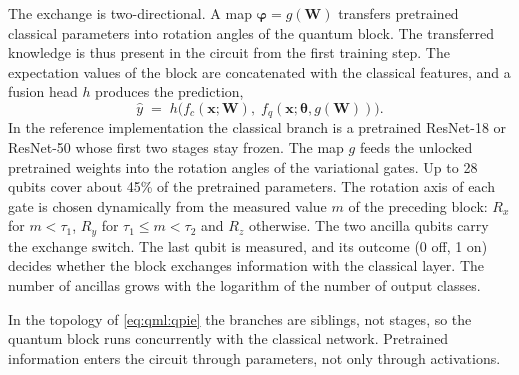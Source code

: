 The exchange is two-directional. A map $\bm{\varphi} = g(\bm{W})$ transfers pretrained classical parameters into rotation angles of the quantum block. The transferred knowledge is thus present in the circuit from the first training step. The expectation values of the block are concatenated with the classical features, and a fusion head $h$ produces the prediction,
\begin{equation}\label{eq:qml:qpie}
\hat{y} \;=\; h\big(f_c(\bm{x}; \bm{W}),\; f_q(\bm{x}; \bm{\theta}, g(\bm{W}))\big).
\end{equation}
In the reference implementation \cite{guo2025qpie} the classical branch is a pretrained ResNet-18 or ResNet-50 whose first two stages stay frozen. The map $g$ feeds the unlocked pretrained weights into the rotation angles of the variational gates. Up to 28 qubits cover about 45\% of the pretrained parameters. The rotation axis of each gate is chosen dynamically from the measured value $m$ of the preceding block: $R_x$ for $m<\tau_1$, $R_y$ for $\tau_1\le m<\tau_2$ and $R_z$ otherwise. The two ancilla qubits carry the exchange switch. The last qubit is measured, and its outcome (0 off, 1 on) decides whether the block exchanges information with the classical layer. The number of ancillas grows with the logarithm of the number of output classes.

In the topology of \cref{eq:qml:qpie} the branches are siblings, not stages, so the quantum block runs concurrently with the classical network. Pretrained information enters the circuit through parameters, not only through activations.

